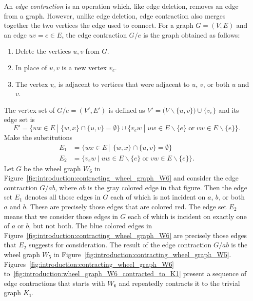 An \emph{edge contraction} is an operation which, like edge deletion,
removes an edge from a graph. However, unlike edge deletion, edge
contraction also merges together the two vertices the edge used to
connect. For a graph $G = (V, E)$ and an edge $uv = e \in E$, the edge
contraction $G/e$ is the graph obtained as follows:
%
\begin{enumerate}
\item Delete the vertices $u,v$ from $G$.

\item In place of $u,v$ is a new vertex $v_e$.

\item The vertex $v_e$ is adjacent to vertices that were adjacent
  to $u$, $v$, or both $u$ and $v$.
\end{enumerate}
The vertex set of $G/e = (V', E')$ is defined as
$V' = \big(V \backslash \{u,v\}\big) \cup \{v_e\}$ and its edge set is
\[
E'
=
\big\{
wx \in E \;\left.\right|\; \{w,x\} \cap \{u,v\} = \emptyset
\big\}
\cup
\big\{
v_e w
\;\left.\right|\;
uw \in E \backslash \{e\} \;\text{or}\; vw \in E \backslash \{e\}
\big\}.
\]
Make the substitutions
%
\begin{align*}
E_1 &= \big\{
wx \in E \;\left.\right|\; \{w,x\} \cap \{u,v\} = \emptyset \big\} \\
E_2 &= \big\{
v_e w \;\left.\right|\;
uw \in E \backslash \{e\} \;\text{or}\; vw \in E \backslash \{e\} \big\}.
\end{align*}
%
Let $G$ be the wheel graph $W_6$ in
Figure~\ref{fig:introduction:contracting_wheel_graph_W6} and consider
the edge contraction $G/ab$, where $ab$ is the gray colored edge in
that figure. Then the edge set $E_1$ denotes all those edges in $G$
each of which is not incident on $a$, $b$, or both $a$ and $b$. These
are precisely those edges that are colored red. The edge set $E_2$
means that we consider those edges in $G$ each of which is incident on
exactly one of $a$ or $b$, but not both. The blue colored edges in
Figure~\ref{fig:introduction:contracting_wheel_graph_W6} are precisely
those edges that $E_2$ suggests for consideration. The result of the
edge contraction $G/ab$ is the wheel graph $W_5$ in
Figure~\ref{fig:introduction:contracting_wheel_graph_W5}.
Figures~\ref{fig:introduction:contracting_wheel_graph_W6}
to~\ref{fig:introduction:wheel_graph_W6_contracted_to_K1} present a
sequence of edge contractions that starts with $W_6$ and repeatedly
contracts it to the trivial graph $K_1$.

